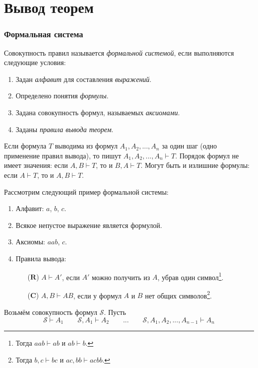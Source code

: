 \part{Вывод теорем}

\section{Формальная система}

Совокупность правил называется {\it формальной системой}, если выполняются следующие
условия:
\begin{enumerate}
	\item{}Задан {\it алфавит} для составления {\it выражений}.
	\item{}Определено понятия {\it формулы}.
	\item{}Задана совокупность формул, называемых {\it аксиомами}.
	\item{}Заданы {\it правила вывода теорем}.
\end{enumerate}

Если формула $T$ выводима из формул $A_1,A_2,...,A_{n}$ за один шаг (одно применение
правил вывода), то пишут $A_1,A_2,...,A_{n}\vdash T$. Порядок формул
не имеет значения: если $A,B\vdash T$, то и $B,A\vdash T$.
Могут быть и излишние формулы: если $A\vdash T$, то и $A,B\vdash T$.

\newcommand\ruleR{\mathbf{R}}
\newcommand\ruleC{\mathbf{C}}

Рассмотрим следующий пример формальной системы:
\begin{enumerate}
	\item{}Алфавит: $a$, $b$, $c$.
	\item{}Всякое непустое выражение является формулой.
	\item{}Аксиомы: $aab$, $c$.
	\item{}Правила вывода:
	\begin{enumerate}
		\item[($\ruleR$)]{}$A\vdash A'$, если $A'$ можно получить из $A$,
		убрав один символ\footnote{Тогда $aab\vdash ab$ и $ab\vdash b$.}.
		\item[($\ruleC$)]{}$A,B\vdash AB$, если у формул $A$ и $B$ нет
		общих символов\footnote{Тогда $b,c\vdash bc$ и $ac,bb\vdash acbb$.}.
	\end{enumerate}
\end{enumerate}

\newcommand\Sx{\mathcal S}
\newcommand\Cx{\mathcal C}
Возьмём совокупность формул $\Sx$. Пусть
\[
	\Sx\vdash A_1\qquad
	\Sx,A_1\vdash A_2\qquad...\qquad
	\Sx,A_1,A_2,...,A_{n-1}\vdash A_{n}
\]

